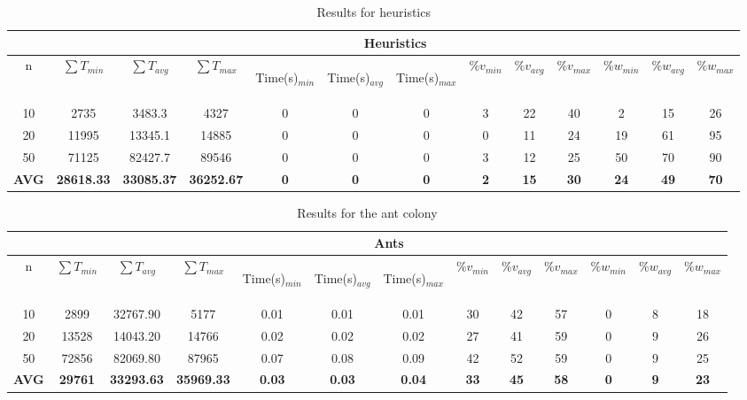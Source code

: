 \documentclass[UTF8, twoside]{EPURapport}
\begin{document}
\begin{table}[!h]
\centering
\tabcolsep=0.11cm
\setlength{\extrarowheight}{1.5pt}
\begin{tabular}{|c|c|c|c|c|c|c|c|c|c|c|c|c|} 
\hline
 & \multicolumn{12}{c|}{Heuristics} \\
\hline
n & $\sum T_{min}$ & $\sum T_{avg}$ & $\sum T_{max}$ & \begin{sideways} Time(s)$_{min}$ \end{sideways} & \begin{sideways} Time(s)$_{avg}$ \end{sideways} & \begin{sideways} Time(s)$_{max}$ \end{sideways} & $\% v_{min}$ & $\% v_{avg}$ & $\% v_{max}$ & $\% w_{min}$ & $\% w_{avg}$ & $\% w_{max}$\\
\hline
10 & 2735 & 3483.3 & 4327 & 0 & 0 & 0 & 3 & 22 & 40 & 2 & 15 & 26\\
\hline
20 & 11995 & 13345.1 & 14885 & 0 & 0 & 0 & 0 & 11 & 24 & 19 & 61 & 95\\
\hline
50 & 71125 & 82427.7 & 89546 & 0 & 0 & 0 & 3 & 12 & 25 & 50 & 70 & 90\\
\hline
\textbf{AVG} & \textbf{28618.33} & \textbf{33085.37} & \textbf{36252.67} & \textbf{0} & \textbf{0} & \textbf{0} & \textbf{2}  & \textbf{15} & \textbf{30} & \textbf{24} & \textbf{49} & \textbf{70}\\
\hline
\end{tabular}
\caption{\label{tab:Heuristics}Results for heuristics}
\end{table}

\begin{table}[!h]
\centering
\tabcolsep=0.11cm
\setlength{\extrarowheight}{1.5pt}
\begin{tabular}{|c|c|c|c|c|c|c|c|c|c|c|c|c|} 
\hline
 & \multicolumn{12}{c|}{Ants} \\
\hline
n & $\sum T_{min}$ & $\sum T_{avg}$ & $\sum T_{max}$ & \begin{sideways} Time(s)$_{min}$ \end{sideways} & \begin{sideways} Time(s)$_{avg}$ \end{sideways} & \begin{sideways} Time(s)$_{max}$ \end{sideways} & $\% v_{min}$ & $\% v_{avg}$ & $\% v_{max}$ & $\% w_{min}$ & $\% w_{avg}$ & $\% w_{max}$\\
\hline
10 & 2899 & 32767.90 & 5177 & 0.01 & 0.01 & 0.01 & 30 & 42 & 57 & 0 & 8 & 18\\
\hline
20 & 13528 & 14043.20 & 14766 & 0.02 & 0.02 & 0.02 & 27 & 41 & 59 & 0 & 9 & 26\\
\hline
50 & 72856 & 82069.80 & 87965 & 0.07 & 0.08 & 0.09 & 42 & 52 & 59 & 0 & 9 & 25\\
\hline
\textbf{AVG}& \textbf{29761} & \textbf{33293.63} & \textbf{35969.33} & \textbf{0.03} & \textbf{0.03} & \textbf{0.04} & \textbf{33} & \textbf{45} & \textbf{58} & \textbf{0} & \textbf{9} & \textbf{23}\\
\hline
\end{tabular}
\caption{\label{tab:ants}Results for the ant colony}
\end{table}
\end{document}
